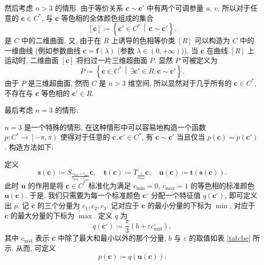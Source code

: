 \documentclass{article}
\begin{document}
然后考虑 $n>3$ 的情形.
由于等价关系 $\mathbf c\sim\mathbf c'$ 中有两个可调参量 $u$, $v$,
所以对于任意的 $\mathbf c\in C^*$,
与 $\mathbf c$ 等色相的全体颜色组成的集合
\begin{equation}
	\left[\mathbf c\right]\coloneqq \left\{\mathbf c'\in C^*\,\middle|\,
	\mathbf c\sim\mathbf c'\right\}.
\end{equation}
是 $C$ 中的二维曲面.
又, 由于在 $R$ 上诱导的色相等价类 $\left[R\right]$
可以构造为 $C$ 中的一维曲线
(例如参数曲线 $\mathbf c=\mathbf f\!\left(\lambda\right)$
(参数 $\lambda\in\left(0,+\infty\right)$)).
当 $\mathbf c$ 在曲线 $\left[R\right]$ 上运动时,
二维曲面 $\left[\mathbf c\right]$ 将扫过一片三维超曲面 $P$.
显然 $P$ 可被定义为
\begin{equation}
	P\coloneqq \left\{\mathbf c\in C^*\,\middle|\,
	\exists\mathbf c'\in R:\mathbf c\sim\mathbf c'\right\}.
\end{equation}
由于 $P$ 是三维超曲面, 然而 $C$ 是 $n>3$ 维空间,
所以显然对于几乎所有的 $\mathbf c\in C^*$,
不存在与 $\mathbf c$ 等色相的 $\mathbf c'\in R$.

最后考虑 $n=3$ 的情形:

$n=3$ 是一个特殊的情形, 在这种情形中可以容易地构造一个函数
$p:C^*\to\left[-\pi,\pi\right)$
使得对于任意的 $\mathbf c,\mathbf c'\in C^*$,
有 $\mathbf c\sim\mathbf c'$ 当且仅当
$p\!\left(\mathbf c\right)=p\!\left(\mathbf c'\right)$.
构造方法如下:

定义
\begin{equation}
	\mathbf s\!\left(\mathbf c\right)\coloneqq 
	S_\frac{c_{\max}+c_{\min}}{c_{\max}-c_{\min}}\mathbf c,
	\quad\mathbf t\!\left(\mathbf c\right)\coloneqq 
	T_\frac1{c_{\max}}\mathbf c,
	\quad\mathbf u\!\left(\mathbf c\right)\coloneqq \mathbf t\!\left(\mathbf s\!\left(\mathbf c\right)\right).
	\label{eq:标准化}
\end{equation}
此时 $\mathbf u$ 的作用是将 $\mathbf c\in C^*$ 标准化为满足
$c_{\min}=0$, $c_{\max}=1$ 的等色相的标准颜色
$\mathbf u\!\left(\mathbf c\right)$.
于是, 我们只需要为每一个标准颜色 $\mathbf c^\circ$
分配一个特征值 $q\!\left(\mathbf c^\circ\right)$, 即可定义出 $p$.
记 $\mathbf c$ 的三个分量为 $c_1,c_2,c_3$.
记对应于 $\mathbf c$ 的最小分量的下标为 $\min$,
对应于 $\mathbf c$ 的最大分量的下标为 $\max$.
定义 $q$ 为
\begin{equation}
	q\!\left(\mathbf c^\circ\right)\coloneqq \frac\pi3\left(b+\varepsilon c^\circ_\mathrm{mid}\right),
\end{equation}
其中 $c_\mathrm{mid}$ 表示 $\mathbf c$ 中除了最大和最小以外的那个分量,
$b$ 与 $\varepsilon$ 的取值如表 \ref{tab:be} 所示.
从而, 可定义
\begin{equation}
	p\!\left(\mathbf c\right)\coloneqq 
	q\!\left(\mathbf u\!\left(\mathbf c\right)\right).
\end{equation}
\end{document}
